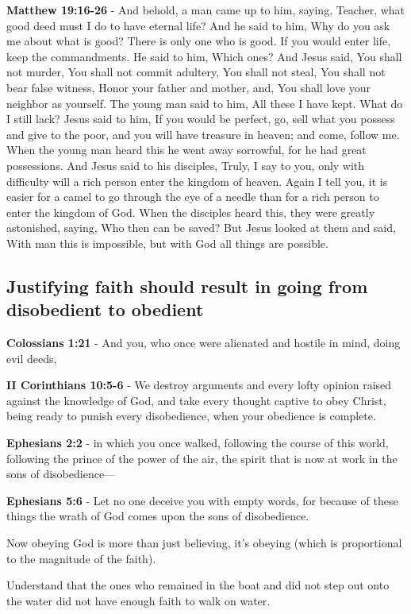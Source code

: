 \documentclass[11pt]{article}
\begin{document}
\textbf{Matthew 19:16-26} - And behold, a man came up to him, saying, Teacher, what good deed must I do to have eternal life? And he said to him, Why do you ask me about what is good? There is only one who is good. If you would enter life, keep the commandments. He said to him, Which ones? And Jesus said, You shall not murder, You shall not commit adultery, You shall not steal, You shall not bear false witness, Honor your father and mother, and, You shall love your neighbor as yourself. The young man said to him, All these I have kept. What do I still lack? Jesus said to him, If you would be perfect, go, sell what you possess and give to the poor, and you will have treasure in heaven; and come, follow me. When the young man heard this he went away sorrowful, for he had great possessions. And Jesus said to his disciples, Truly, I say to you, only with difficulty will a rich person enter the kingdom of heaven. Again I tell you, it is easier for a camel to go through the eye of a needle than for a rich person to enter the kingdom of God. When the disciples heard this, they were greatly astonished, saying, Who then can be saved? But Jesus looked at them and said, With man this is impossible, but with God all things are possible.

\subsection{Justifying faith should result in going from disobedient to obedient}
\label{sec:org0eec0b3}
\textbf{Colossians 1:21} - And you, who once were alienated and hostile in mind, doing evil deeds,

\textbf{II Corinthians 10:5-6} - We destroy arguments and every lofty opinion raised against the knowledge of God, and take every thought captive to obey Christ, being ready to punish every disobedience, when your obedience is complete.

\textbf{Ephesians 2:2} - in which you once walked, following the course of this world, following the prince of the power of the air, the spirit that is now at work in the sons of disobedience—

\textbf{Ephesians 5:6} - Let no one deceive you with empty words, for because of these things the wrath of God comes upon the sons of disobedience.

Now obeying God is more than just believing, it's obeying (which is proportional to the magnitude of the faith).

Understand that the ones who remained in the boat and did not step out onto the water did not have enough faith to walk on water.
\end{document}
